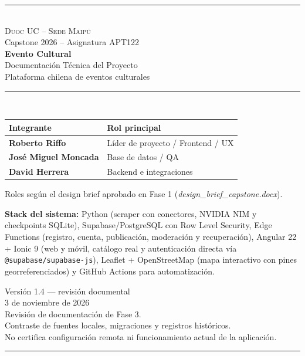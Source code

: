 \documentclass[11pt,a4paper]{article}
\title{}
\author{}
\date{}
\begin{document}

\hypersetup{pageanchor=false}
\begin{titlepage}
\centering
{\color{terracota}\rule{\textwidth}{2pt}}\\[0.6cm]
{\Large \textsc{Duoc UC -- Sede Maipú}}\\[0.2cm]
{\large Capstone 2026 -- Asignatura APT122}\\[1.4cm]
{\color{terracota}\Huge \textbf{Evento Cultural}}\\[0.5cm]
{\LARGE Documentación Técnica del Proyecto}\\[0.4cm]
{\large Plataforma chilena de eventos culturales}\\[1.2cm]
{\color{terracota}\rule{\textwidth}{1pt}}\\[1.2cm]

\begin{minipage}{0.82\textwidth}
\renewcommand{\arraystretch}{1.35}
\begin{center}
\begin{tabular}{>{\bfseries}l l}
Integrante & Rol principal \\ \midrule
Roberto Riffo & Líder de proyecto / Frontend / UX \\
José Miguel Moncada & Base de datos / QA \\
David Herrera & Backend e integraciones \\
\end{tabular}
\end{center}
\vspace{0.2cm}
{\small Roles según el design brief aprobado en Fase 1 (\textit{design\_brief\_capstone.docx}).}
\end{minipage}

\vspace{1.2cm}
\begin{minipage}{0.82\textwidth}
\small
\textbf{Stack del sistema:} Python (scraper con conectores, NVIDIA NIM y checkpoints SQLite),
Supabase/PostgreSQL con Row Level Security, Edge Functions (registro, cuenta, publicación, moderación y recuperación),
Angular 22 + Ionic 9 (web y móvil, catálogo real y autenticación directa vía \texttt{@supabase/supabase-js}),
Leaflet + OpenStreetMap (mapa interactivo con pines georreferenciados) y GitHub Actions para automatización.
\end{minipage}

\vfill
{\large Versión 1.4 — revisión documental}\\[0.2cm]
{\large 3 de noviembre de 2026}\\[0.4cm]
{\small Revisión de documentación de Fase 3.\\
Contraste de fuentes locales, migraciones y registros históricos.\\
No certifica configuración remota ni funcionamiento actual de la aplicación.}\\[0.3cm]
{\color{terracota}\rule{\textwidth}{2pt}}
\end{titlepage}
\hypersetup{pageanchor=true}
\end{document}
